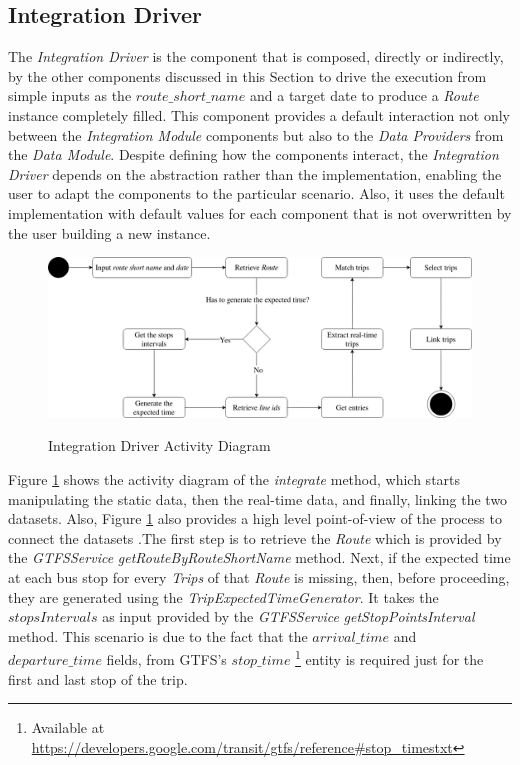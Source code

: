\subsection{Integration Driver}
The { \em Integration Driver} is the component that is composed, directly or indirectly, by the other components 
discussed in this Section to drive the execution from simple inputs as the $route\_short\_name$ and a target date
to produce a \textit{Route} instance completely filled. This component provides a default interaction not only 
between the \textit{Integration Module} components but also to the \textit{Data Providers} 
from the \textit{Data Module}.
Despite defining how the components interact, the { \em Integration Driver} depends on the abstraction
rather than the implementation, enabling the user to adapt the components to the particular scenario. Also,
it uses the default implementation with default values
for each component that is not overwritten by the user building a new instance.

    \begin{figure}[h]
        \centering
        \caption{Integration Driver Activity Diagram}
        \includegraphics[width=\textwidth]{imagem/cap4/integrationDriverAD.drawio.png}
        \label{img:4:integrationDriverAD}
    \end{figure}

Figure \ref{img:4:integrationDriverAD} shows the activity diagram of the \textit{integrate} method, which starts manipulating
the static data, then the real-time data, and finally, linking the two datasets. Also, Figure \ref{img:4:integrationDriverAD} 
also provides a high level point-of-view of the process to connect the datasets
.The first step
is to retrieve the \textit{Route} which is provided by the \textit{GTFSService} \textit{getRouteByRouteShortName}
method. Next, if the expected time at each bus stop for every \textit{Trips} of that
\textit{Route} is missing, then, before proceeding,
they are generated using the \textit{TripExpectedTimeGenerator}.
It takes the $stopsIntervals$ as input provided by the \textit{GTFSService} \textit{getStopPointsInterval} method. 
This scenario is due to the fact that the $arrival\_time$ and $departure\_time$ fields, from GTFS's $stop\_time$ 
\footnote{Available at \url{https://developers.google.com/transit/gtfs/reference#stop_timestxt}} entity is 
required just for the first and last stop of the trip.

